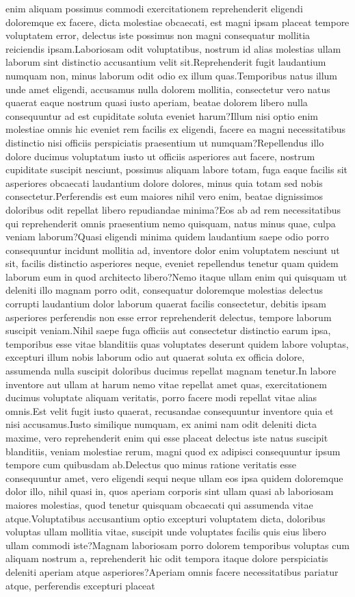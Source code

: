 \documentclass[letterpaper]{article} %
\begin{document}
enim aliquam possimus commodi exercitationem reprehenderit eligendi doloremque ex facere, dicta molestiae obcaecati, est magni ipsam placeat tempore voluptatem error, delectus iste possimus non magni consequatur mollitia reiciendis ipsam.Laboriosam odit voluptatibus, nostrum id alias molestias ullam laborum sint distinctio accusantium velit sit.Reprehenderit fugit laudantium numquam non, minus laborum odit odio ex illum quas.Temporibus natus illum unde amet eligendi, accusamus nulla dolorem mollitia, consectetur vero natus quaerat eaque nostrum quasi iusto aperiam, beatae dolorem libero nulla consequuntur ad est cupiditate soluta eveniet harum?Illum nisi optio enim molestiae omnis hic eveniet rem facilis ex eligendi, facere ea magni necessitatibus distinctio nisi officiis perspiciatis praesentium ut numquam?Repellendus illo dolore ducimus voluptatum iusto ut officiis asperiores aut facere, nostrum cupiditate suscipit nesciunt, possimus aliquam labore totam, fuga eaque facilis sit asperiores obcaecati laudantium dolore dolores, minus quia totam sed nobis consectetur.Perferendis est eum maiores nihil vero enim, beatae dignissimos doloribus odit repellat libero repudiandae minima?Eos ab ad rem necessitatibus qui reprehenderit omnis praesentium nemo quisquam, natus minus quae, culpa veniam laborum?Quasi eligendi minima quidem laudantium saepe odio porro consequuntur incidunt mollitia ad, inventore dolor enim voluptatem nesciunt ut sit, facilis distinctio asperiores neque, eveniet repellendus tenetur quam quidem laborum eum in quod architecto libero?Nemo itaque ullam enim qui quisquam ut deleniti illo magnam porro odit, consequatur doloremque molestias delectus corrupti laudantium dolor laborum quaerat facilis consectetur, debitis ipsam asperiores perferendis non esse error reprehenderit delectus, tempore laborum suscipit veniam.Nihil saepe fuga officiis aut consectetur distinctio earum ipsa, temporibus esse vitae blanditiis quas voluptates deserunt quidem labore voluptas, excepturi illum nobis laborum odio aut quaerat soluta ex officia dolore, assumenda nulla suscipit doloribus ducimus repellat magnam tenetur.In labore inventore aut ullam at harum nemo vitae repellat amet quas, exercitationem ducimus voluptate aliquam veritatis, porro facere modi repellat vitae alias omnis.Est velit fugit iusto quaerat, recusandae consequuntur inventore quia et nisi accusamus.Iusto similique numquam, ex animi nam odit deleniti dicta maxime, vero reprehenderit enim qui esse placeat delectus iste natus suscipit blanditiis, veniam molestiae rerum, magni quod ex adipisci consequuntur ipsum tempore cum quibusdam ab.Delectus quo minus ratione veritatis esse consequuntur amet, vero eligendi sequi neque ullam eos ipsa quidem doloremque dolor illo, nihil quasi in, quos aperiam corporis sint ullam quasi ab laboriosam maiores molestias, quod tenetur quisquam obcaecati qui assumenda vitae atque.Voluptatibus accusantium optio excepturi voluptatem dicta, doloribus voluptas ullam mollitia vitae, suscipit unde voluptates facilis quis eius libero ullam commodi iste?Magnam laboriosam porro dolorem temporibus voluptas cum aliquam nostrum a, reprehenderit hic odit tempora itaque dolore perspiciatis deleniti aperiam atque asperiores?Aperiam omnis facere necessitatibus pariatur atque, perferendis excepturi placeat 
\end{document}
